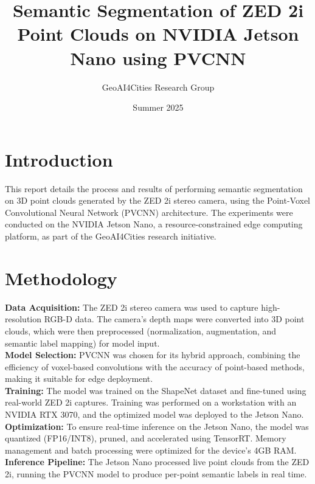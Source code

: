 \documentclass[12pt,a4paper]{article}
\title{Semantic Segmentation of ZED 2i Point Clouds on NVIDIA Jetson Nano using PVCNN}
\author{GeoAI4Cities Research Group}
\date{Summer 2025}
\begin{document}
\maketitle

\section*{Introduction}
This report details the process and results of performing semantic segmentation on 3D point clouds generated by the ZED 2i stereo camera, using the Point-Voxel Convolutional Neural Network (PVCNN) architecture. The experiments were conducted on the NVIDIA Jetson Nano, a resource-constrained edge computing platform, as part of the GeoAI4Cities research initiative.

\section*{Methodology}
\textbf{Data Acquisition:} The ZED 2i stereo camera was used to capture high-resolution RGB-D data. The camera’s depth maps were converted into 3D point clouds, which were then preprocessed (normalization, augmentation, and semantic label mapping) for model input.\\
\textbf{Model Selection:} PVCNN was chosen for its hybrid approach, combining the efficiency of voxel-based convolutions with the accuracy of point-based methods, making it suitable for edge deployment.\\
\textbf{Training:} The model was trained on the ShapeNet dataset and fine-tuned using real-world ZED 2i captures. Training was performed on a workstation with an NVIDIA RTX 3070, and the optimized model was deployed to the Jetson Nano.\\
\textbf{Optimization:} To ensure real-time inference on the Jetson Nano, the model was quantized (FP16/INT8), pruned, and accelerated using TensorRT. Memory management and batch processing were optimized for the device’s 4GB RAM.\\
\textbf{Inference Pipeline:} The Jetson Nano processed live point clouds from the ZED 2i, running the PVCNN model to produce per-point semantic labels in real time.
\end{document}
